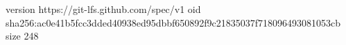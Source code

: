 version https://git-lfs.github.com/spec/v1
oid sha256:ac0e41b5fcc3dded40938ed95dbbf650892f9c21835037f718096493081053cb
size 248
